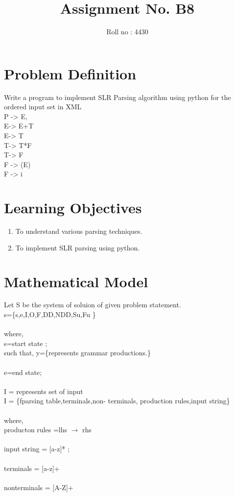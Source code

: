 \documentclass[12pt]{article}
\title{Assignment No. B8}
\author{Roll no : 4430}
\date{}
\begin{document}
  \maketitle
  
\section{Problem Definition}
Write a program to implement SLR Parsing algorithm using python for the ordered input set
in XML\\
P -> E,\\
E-> E+T\\
E-> T\\
T-> T*F\\
T-> F\\
F -> (E)\\
F -> i\\

\section{Learning Objectives}

\begin{enumerate}
\item To understand various parsing techniques.
\item To implement SLR parsing using python.
\end{enumerate}



\section{Mathematical Model}
Let S be the system of soluion of given problem statement.\\
s=\{s,e,I,O,F,DD,NDD,Su,Fu \}\\\\
where,\\
s=start state ;\\
such that, y=\{represents grammar productions.\}\\\\
e=end state;\\\\
I =  represents set of input\\
I = \{fparsing table,terminals,non- terminals, production rules,input string\}\\\\
where,\\
producton rules =lhs $\rightarrow$  rhs\\\\ input string = [a-z]* ;\\\\ terminals =   [a-z]+ \\\\nonterminals =  [A-Z]+\\\\
\end{document}
